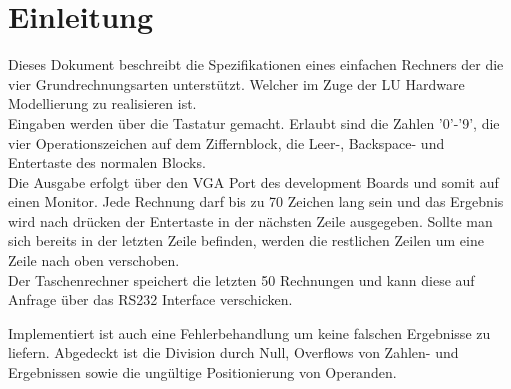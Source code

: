 \section{Einleitung}

Dieses Dokument beschreibt die Spezifikationen eines einfachen Rechners der die vier Grundrechnungsarten unterstützt.
Welcher im Zuge der LU Hardware Modellierung zu realisieren ist.\\
Eingaben werden über die Tastatur gemacht. Erlaubt sind die Zahlen '0'-'9', die vier Operationszeichen auf dem Ziffernblock, 
die Leer-, Backspace- und Entertaste des normalen Blocks.\\
Die Ausgabe erfolgt über den VGA Port des development Boards und somit auf einen Monitor. Jede Rechnung darf bis zu 70 Zeichen lang sein und das Ergebnis wird nach drücken der Entertaste
in der nächsten Zeile ausgegeben. Sollte man sich bereits in der letzten Zeile befinden, werden die restlichen Zeilen um eine Zeile nach oben
verschoben.\\
Der Taschenrechner speichert die letzten 50 Rechnungen und kann diese auf Anfrage über das RS232 Interface verschicken.

Implementiert ist auch eine Fehlerbehandlung um keine falschen Ergebnisse zu liefern. Abgedeckt ist die Division durch Null, Overflows von
Zahlen- und Ergebnissen sowie die ungültige Positionierung von Operanden.
